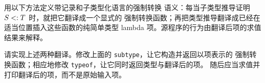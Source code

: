 \begin{exercise}[\(\star\star\star\), \(\nrightarrow\)]
\label{ex:17.3.4}
用以下方法定义带记录和子类型化语言的强制转换
语义：每当子类型推导证明 \(S\mathrel{<:} T\) 时，就把它翻译成一个显式的
强制转换函数；再把类型推导翻译成已经在适当位置插入这些函数的纯简单类型
lambda 项。源程序的行为由翻译后项的求值结果来解释。

请实现上述两种翻译。修改上面的 \texttt{subtype}，让它构造并返回以项表示的
强制转换函数；相应地修改 \texttt{typeof}，让它同时返回类型与翻译后的项。
随后应当求值并打印翻译后的项，而不是原始输入项。
\end{exercise}
